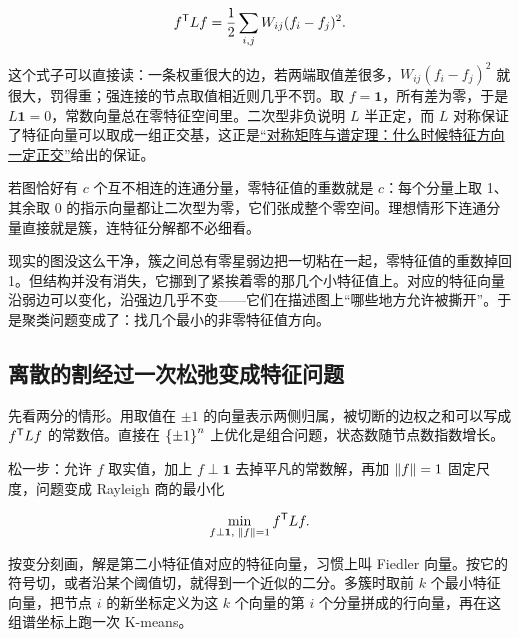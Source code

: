\[
f^{\mathsf{T}}Lf=\frac12\sum_{i,j}W_{ij}(f_i-f_j)^2 .
\]

这个式子可以直接读：一条权重很大的边，若两端取值差很多，\(W_{ij}(f_i-f_j)^2\) 就很大，罚得重；强连接的节点取值相近则几乎不罚。取 \(f=\mathbf 1\)，所有差为零，于是 \(L\mathbf 1=0\)，常数向量总在零特征空间里。二次型非负说明 \(L\) 半正定，而 \(L\) 对称保证了特征向量可以取成一组正交基，这正是\hyperref[sec:03-Linear-Algebra/06-Symmetric-and-Positive-Definite-Matrices/01]{``对称矩阵与谱定理：什么时候特征方向一定正交''}给出的保证。

若图恰好有 \(c\) 个互不相连的连通分量，零特征值的重数就是 \(c\)：每个分量上取 1、其余取 0 的指示向量都让二次型为零，它们张成整个零空间。理想情形下连通分量直接就是簇，连特征分解都不必细看。

现实的图没这么干净，簇之间总有零星弱边把一切粘在一起，零特征值的重数掉回 1。但结构并没有消失，它挪到了紧挨着零的那几个小特征值上。对应的特征向量沿弱边可以变化，沿强边几乎不变——它们在描述图上``哪些地方允许被撕开''。于是聚类问题变成了：找几个最小的非零特征值方向。

\subsection{离散的割经过一次松弛变成特征问题}

先看两分的情形。用取值在 \(\pm1\) 的向量表示两侧归属，被切断的边权之和可以写成 \(f^{\mathsf{T}}Lf\) 的常数倍。直接在 \(\left\{\pm1\right\}^n\) 上优化是组合问题，状态数随节点数指数增长。

松一步：允许 \(f\) 取实值，加上 \(f\perp\mathbf 1\) 去掉平凡的常数解，再加 \(\left\lVert f\right\rVert=1\) 固定尺度，问题变成 Rayleigh 商的最小化

\[
\min_{f\perp\mathbf 1,\;\left\lVert f\right\rVert=1} f^{\mathsf{T}}Lf .
\]

按变分刻画，解是第二小特征值对应的特征向量，习惯上叫 Fiedler 向量。按它的符号切，或者沿某个阈值切，就得到一个近似的二分。多簇时取前 \(k\) 个最小特征向量，把节点 \(i\) 的新坐标定义为这 \(k\) 个向量的第 \(i\) 个分量拼成的行向量，再在这组谱坐标上跑一次 K-means。

